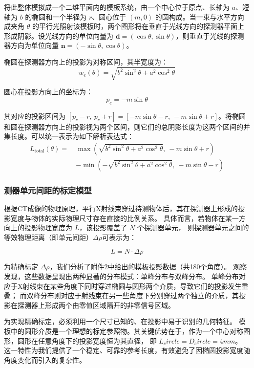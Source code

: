 将此整体模拟成一个二维平面内的模板系统，由一个中心位于原点、长轴为 $a$、短轴为 $b$ 的椭圆和一个半径为 $r$、圆心位于 $(m, 0)$ 的圆构成。当一束与水平方向成夹角 $\theta$ 的平行光照射该模板时，两个图形将在垂直于光线方向的探测器平面上形成阴影。设光线方向的单位向量为 $\mathbf{d} = (\cos\theta, \sin\theta)$，则垂直于光线的探测器方向为单位向量 $\mathbf{n} = (-\sin\theta, \cos\theta)$。

椭圆在探测器方向上的投影为对称区间，其半宽度为：
\[
w_e(\theta) = \sqrt{b^2 \sin^2\theta + a^2 \cos^2\theta}
\]

圆心在投影方向上的坐标为：
\[
p_c = -m \sin\theta
\]

其对应的投影区间为 $[p_c - r,\ p_c + r] = [-m \sin\theta - r,\ -m \sin\theta + r]$。将椭圆和圆在探测器方向上的投影视为两个区间，则它们的总阴影长度为这两个区间的并集长度。可以统一表示为如下解析表达式：
\begin{equation}
\begin{split}
L_{\text{total}}(\theta) =\ & \max\left( \sqrt{b^2 \sin^2\theta + a^2 \cos^2\theta},\ -m \sin\theta + r \right) \\
& - \min\left( -\sqrt{b^2 \sin^2\theta + a^2 \cos^2\theta},\ -m \sin\theta - r \right)
\end{split}
\end{equation}






\subsubsection{测器单元间距的标定模型}

根据CT成像的物理原理，平行X射线束穿过待测物体后，其在探测器上形成的投影宽度与物体的实际物理尺寸存在直接的比例关系。
具体而言，若物体在某一方向上的投影物理宽度为 $L$，该投影覆盖了 $N$ 个探测器单元，
则探测器单元之间的等效物理距离（即单元间距）$\Delta\rho$可表示为：

$$L = N \cdot \Delta\rho$$

为精确标定 $\Delta\rho$，我们分析了附件2中给出的模板投影数据（共180个角度）。
观察发现，这些数据呈现出两种显著的分布模式：单峰分布与双峰分布。
单峰分布对应于X射线束在某些角度下同时穿过椭圆与圆形两个介质，导致它们的投影发生重叠；
而双峰分布则对应于射线束在另一些角度下分别穿过两个独立的介质，其投影在探测器上形成两个由零值区域隔开的非零信号区域。
\par


为实现精确标定，必须利用一个尺寸已知的、在投影中易于识别的几何特征。
模板中的圆形介质是一个理想的标定参照物。其关键优势在于，作为一个中心对称图形，圆形在任意角度下的投影宽度恒为其直径，
即 $L_circle = D_circle = 4 mm$。
这一特性为我们提供了一个稳定、可靠的参考长度，有效避免了因椭圆投影宽度随角度变化而引入的复杂性。\par



